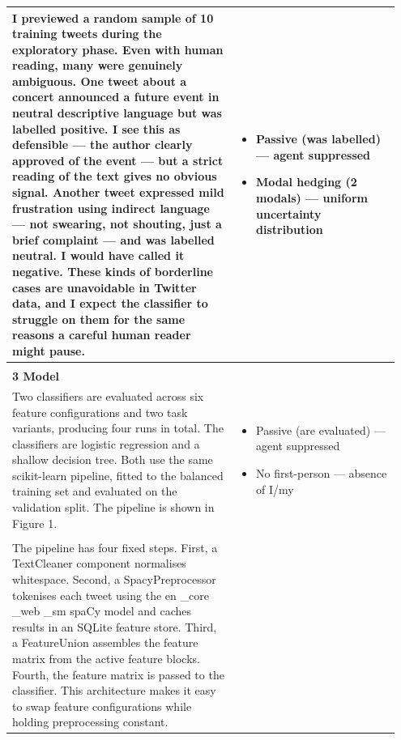 \documentclass[11pt]{article}
\begin{document}
\begin{longtable}{|p{0.55\linewidth}|p{0.40\linewidth}|}
I previewed a random sample of 10 training tweets during the exploratory phase. Even with human reading, many were genuinely ambiguous. One tweet about a concert announced a future event in neutral descriptive language but was labelled positive. I see this as defensible --- the author clearly approved of the event --- but a strict reading of the text gives no obvious signal. Another tweet expressed mild frustration using indirect language --- not swearing, not shouting, just a brief complaint --- and was labelled neutral. I would have called it negative. These kinds of borderline cases are unavoidable in Twitter data, and I expect the classifier to struggle on them for the same reasons a careful human reader might pause. & \begin{itemize}[leftmargin=1em,itemsep=1pt,topsep=1pt,parsep=0pt]
  \item Passive (was labelled) --- agent suppressed
  \item Modal hedging (2 modals) --- uniform uncertainty distribution
\end{itemize} \\[2pt]
\hline
\rule{0pt}{3.5cm} & \\
\hline
\textbf{3 Model}\\[4pt]
Two classifiers are evaluated across six feature configurations and two task variants, producing four runs in total. The classifiers are logistic regression and a shallow decision tree. Both use the same scikit-learn pipeline, fitted to the balanced training set and evaluated on the validation split. The pipeline is shown in Figure 1. & \begin{itemize}[leftmargin=1em,itemsep=1pt,topsep=1pt,parsep=0pt]
  \item Passive (are evaluated) --- agent suppressed
  \item No first-person --- absence of I/my
\end{itemize} \\[2pt]
\hline
\rule{0pt}{3.5cm} & \\
\hline
The pipeline has four fixed steps. First, a TextCleaner component normalises whitespace. Second, a SpacyPreprocessor tokenises each tweet using the en \_core \_web \_sm spaCy model and caches results in an SQLite feature store. Third, a FeatureUnion assembles the feature matrix from the active feature blocks. Fourth, the feature matrix is passed to the classifier. This architecture makes it easy to swap feature configurations while holding preprocessing constant. & \begin{itemize}[leftmargin=1em,itemsep=1pt,topsep=1pt,parsep=0pt]

\end{itemize}
\end{longtable}
\end{document}
